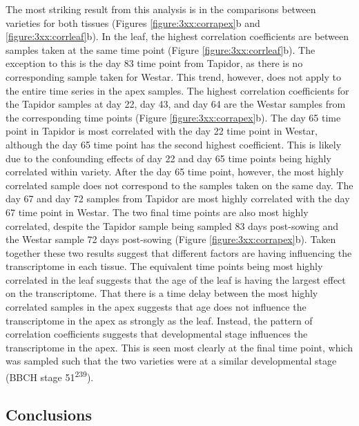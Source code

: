 \documentclass[12pt,]{book}
\begin{document}
The most striking result from this analysis is in the comparisons
between varieties for both tissues (Figures \ref{figure:3xx:corrapex}b
and \ref{figure:3xx:corrleaf}b). In the leaf, the highest correlation
coefficients are between samples taken at the same time point (Figure
\ref{figure:3xx:corrleaf}b). The exception to this is the day 83 time
point from Tapidor, as there is no corresponding sample taken for
Westar. This trend, however, does not apply to the entire time series in
the apex samples. The highest correlation coefficients for the Tapidor
samples at day 22, day 43, and day 64 are the Westar samples from the
corresponding time points (Figure \ref{figure:3xx:corrapex}b). The day
65 time point in Tapidor is most correlated with the day 22 time point
in Westar, although the day 65 time point has the second highest
coefficient. This is likely due to the confounding effects of day 22 and
day 65 time points being highly correlated within variety. After the day
65 time point, however, the most highly correlated sample does not
correspond to the samples taken on the same day. The day 67 and day 72
samples from Tapidor are most highly correlated with the day 67 time
point in Westar. The two final time points are also most highly
correlated, despite the Tapidor sample being sampled 83 days post-sowing
and the Westar sample 72 days post-sowing (Figure
\ref{figure:3xx:corrapex}b). Taken together these two results suggest
that different factors are having influencing the transcriptome in each
tissue. The equivalent time points being most highly correlated in the
leaf suggests that the age of the leaf is having the largest effect on
the transcriptome. That there is a time delay between the most highly
correlated samples in the apex suggests that age does not influence the
transcriptome in the apex as strongly as the leaf. Instead, the pattern
of correlation coefficients suggests that developmental stage influences
the transcriptome in the apex. This is seen most clearly at the final
time point, which was sampled such that the two varieties were at a
similar developmental stage (BBCH stage 51\textsuperscript{239}).

\subsection{Conclusions}\label{conclusions-4}
\end{document}
